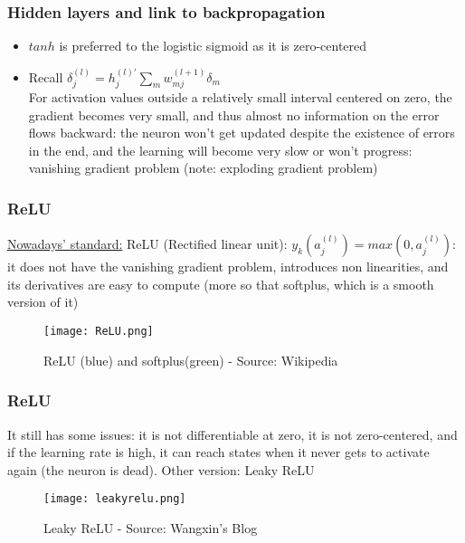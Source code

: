 \documentclass{beamer}
\begin{document}
\begin{frame}
	\frametitle{Hidden layers and link to backpropagation}
    \begin{itemize}
    	\item $tanh$ is preferred to the logistic sigmoid as it is zero-centered
        \item Recall $\delta^{(l)}_j = h^{(l)'}_j\sum_{m}w^{(l+1)}_{mj}\delta_m$\\
        For activation values outside a relatively small interval centered on zero, the gradient becomes very small, and thus almost no information on the error flows backward: the neuron  won't get updated despite the existence of errors in the  end, and the learning will become very slow or won't progress: {\color{red} vanishing gradient problem} (note: exploding gradient problem)
    \end{itemize}
\end{frame}

\begin{frame}
	\frametitle{ReLU}
	 \underline{Nowadays' standard:} ReLU (Rectified linear unit): $y_k(a^{(l)}_j) = max(0, a^{(l)}_j)$: it does not have the vanishing gradient problem, introduces non linearities, and its derivatives are easy to compute (more so that softplus, which is a smooth version of it)
     \begin{figure}
		\texttt{[image: ReLU.png]}
		\caption{ReLU (blue) and softplus(green) - Source: Wikipedia}
	 \end{figure}
\end{frame}

\begin{frame}
	\frametitle{ReLU}
It still has some issues: it is not differentiable at zero, it is not zero-centered, and if the learning rate is high, it can reach states when it never gets to activate again (the neuron is dead).\break
Other version: Leaky ReLU  
\begin{figure}
		\texttt{[image: leakyrelu.png]}
		\caption{Leaky ReLU - Source: Wangxin's Blog}
	 \end{figure}
\end{frame}
\end{document}
